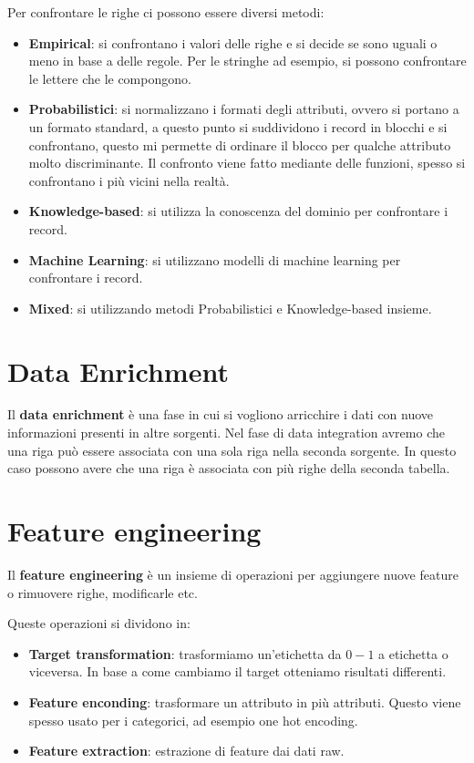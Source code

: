 Per confrontare le righe ci possono essere diversi metodi:
\begin{itemize}
      \item \textbf{Empirical}: si confrontano i valori delle righe e si decide
            se sono uguali o meno in base a delle regole. Per le stringhe ad
            esempio, si possono confrontare le lettere che le compongono.
      \item \textbf{Probabilistici}: si normalizzano i formati degli attributi,
            ovvero si portano a un formato standard, a questo punto si suddividono
            i record in blocchi e si confrontano, questo mi permette di ordinare
            il blocco per qualche attributo molto discriminante. Il confronto viene
            fatto mediante delle funzioni, spesso si confrontano i più vicini
            nella realtà.
      \item \textbf{Knowledge-based}: si utilizza la conoscenza del dominio per
            confrontare i record.
      \item \textbf{Machine Learning}: si utilizzano modelli di machine learning
            per confrontare i record.
      \item \textbf{Mixed}: si utilizzando metodi Probabilistici e Knowledge-based
            insieme.
\end{itemize}
\section{Data Enrichment}
Il \textbf{data enrichment} è una fase in cui si vogliono arricchire i dati con
nuove informazioni presenti in altre sorgenti. Nel fase di data integration
avremo che una riga può essere associata con una sola riga nella seconda sorgente.
In questo caso possono avere che una riga è associata con più righe della seconda
tabella.

\section{Feature engineering}
Il \textbf{feature engineering} è un insieme di operazioni per aggiungere nuove
feature o rimuovere righe, modificarle etc.

Queste operazioni si dividono in:
\begin{itemize}
      \item \textbf{Target transformation}: trasformiamo un'etichetta da $0-1$ a
            etichetta o viceversa. In base a come cambiamo il target otteniamo
            risultati differenti.
      \item \textbf{Feature enconding}: trasformare un attributo in più attributi.
            Questo viene spesso usato per i categorici, ad esempio one hot encoding.
      \item \textbf{Feature extraction}: estrazione di feature dai dati raw.
\end{itemize}